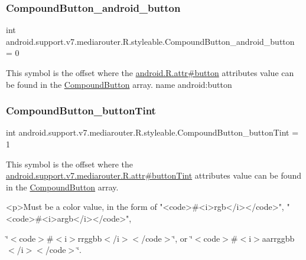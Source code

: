 \subsubsection{\texorpdfstring{Compound\+Button\+\_\+android\+\_\+button}{CompoundButton\_android\_button}}
{\footnotesize\ttfamily int android.\+support.\+v7.\+mediarouter.\+R.\+styleable.\+Compound\+Button\+\_\+android\+\_\+button = 0\hspace{0.3cm}{\ttfamily [static]}}

This symbol is the offset where the \hyperlink{}{android.\+R.\+attr\#button} attribute\textquotesingle{}s value can be found in the \hyperlink{classandroid_1_1support_1_1v7_1_1mediarouter_1_1R_1_1styleable_a9eda6207848fcda69affb749b57b23b9}{Compound\+Button} array.  name android\+:button \mbox{\label{classandroid_1_1support_1_1v7_1_1mediarouter_1_1R_1_1styleable_aeb077255316e6bd00655e23b070c34fc}} 
\subsubsection{\texorpdfstring{Compound\+Button\+\_\+button\+Tint}{CompoundButton\_buttonTint}}
{\footnotesize\ttfamily int android.\+support.\+v7.\+mediarouter.\+R.\+styleable.\+Compound\+Button\+\_\+button\+Tint = 1\hspace{0.3cm}{\ttfamily [static]}}

This symbol is the offset where the \hyperlink{classandroid_1_1support_1_1v7_1_1mediarouter_1_1R_1_1attr_a7a0864e38dac2a7dab7d5eb405509714}{android.\+support.\+v7.\+mediarouter.\+R.\+attr\#button\+Tint} attribute\textquotesingle{}s value can be found in the \hyperlink{classandroid_1_1support_1_1v7_1_1mediarouter_1_1R_1_1styleable_a9eda6207848fcda69affb749b57b23b9}{Compound\+Button} array.

\begin{DoxyVerb}      <p>Must be a color value, in the form of "<code>#<i>rgb</i></code>", "<code>#<i>argb</i></code>",
\end{DoxyVerb}
 \char`\"{}$<$code$>$\#$<$i$>$rrggbb$<$/i$>$$<$/code$>$\char`\"{}, or \char`\"{}$<$code$>$\#$<$i$>$aarrggbb$<$/i$>$$<$/code$>$\char`\"{}. 


